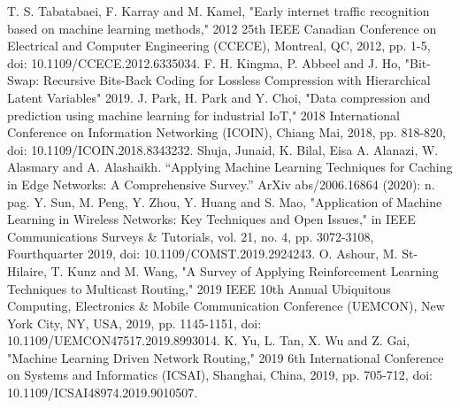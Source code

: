 \documentclass[conference]{IEEEtran}
\begin{document}
\begin{thebibliography}{1}
T. S. Tabatabaei, F. Karray and M. Kamel, "Early internet traffic recognition based on machine learning methods," 2012 25th IEEE Canadian Conference on Electrical and Computer Engineering (CCECE), Montreal, QC, 2012, pp. 1-5, doi: 10.1109/CCECE.2012.6335034.
F. H. Kingma, P. Abbeel and J. Ho, "Bit-Swap: Recursive Bits-Back Coding for Lossless Compression with Hierarchical Latent Variables" 2019.
J. Park, H. Park and Y. Choi, "Data compression and prediction using machine learning for industrial IoT," 2018 International Conference on Information Networking (ICOIN), Chiang Mai, 2018, pp. 818-820, doi: 10.1109/ICOIN.2018.8343232.
Shuja, Junaid, K. Bilal, Eisa A. Alanazi, W. Alasmary and A. Alashaikh. “Applying Machine Learning Techniques for Caching in Edge Networks: A Comprehensive Survey.” ArXiv abs/2006.16864 (2020): n. pag.
Y. Sun, M. Peng, Y. Zhou, Y. Huang and S. Mao, "Application of Machine Learning in Wireless Networks: Key Techniques and Open Issues," in IEEE Communications Surveys \& Tutorials, vol. 21, no. 4, pp. 3072-3108, Fourthquarter 2019, doi: 10.1109/COMST.2019.2924243.
O. Ashour, M. St-Hilaire, T. Kunz and M. Wang, "A Survey of Applying Reinforcement Learning Techniques to Multicast Routing," 2019 IEEE 10th Annual Ubiquitous Computing, Electronics \& Mobile Communication Conference (UEMCON), New York City, NY, USA, 2019, pp. 1145-1151, doi: 10.1109/UEMCON47517.2019.8993014.
K. Yu, L. Tan, X. Wu and Z. Gai, "Machine Learning Driven Network Routing," 2019 6th International Conference on Systems and Informatics (ICSAI), Shanghai, China, 2019, pp. 705-712, doi: 10.1109/ICSAI48974.2019.9010507.

\end{thebibliography}




\end{document}
